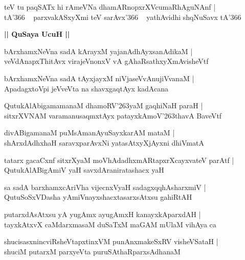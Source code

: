 \documentclass[twoside,12pt,openright]{book}
\def\S{\char'263}
\newcounter{shloka}[chapter]
\def\uvaca#1{\centerline{{\large\textbf{#1}}}}
\begin{document}
\begin{shloka}%
teV tu paqSATx hi rAmeVNa dhamARnopxrXVcumaRhAguNAnf |\\
tA\char'366 ~ parxvakASxyXmi  teV sarAvx\char'366 ~ yathAvidhi shqNuSavx tA\char'366
\end{shloka}

\uvaca{|| QuSaya UcuH ||}

\begin{shloka}%
bArxhamxNeVna sadA kArayxM yajanAdhAyxsanAdikaM |\\
veVdAnapxThitAvx virajeVnonxV vA gAhaRsathxyXmAvisheVtf
\end{shloka}

\begin{shloka}%
bArxhamxNeVna sadA tAyxjayxM niVjaseVvAnujiVvanaM |\\
ApadagxtoVpi jeVveVta na shavxgaqtAyx kadAcana 
\end{shloka}

\begin{shloka}%
QutukAlAbigamamanaM dhamoRV\S yaM gaqhiNaH paraH |\\
sitxrXVNAM varamanusaqmxtAyx patayxkAmoV\S thavA BaveVtf
\end{shloka}

\begin{shloka}%
divABigamanaM puMsAmanAyuSayxkarAM mataM |\\
shArxdAdhxhaH saravxparAvxNi yatasAtxyXjAyxni dhiVmatA 
\end{shloka}

\begin{shloka}%
tatarx gacaCxnf sitxrXyaM moVhAdadhxmARtapxrXcayxvateV parAtf |\\
QutukAlABigAmiV yaH savxdAraniratashacx yaH 
\end{shloka}

\begin{shloka}%
sa sadA barxhamxcAriVha vijecnxVyaH sadagxqqhAsharxmiV |\\
QutuSoSxVDasha yAmiVnayxshacxtasarxsAtxsu gahiRtAH
\end{shloka}

\begin{shloka}%
putarxdAsAtxsu yA yugAmx ayugAmxH kanayxkAparxdAH |\\
tayxkAtxvX caMdarxmasaM duSaTxM maGAM mUlaM vihAya ca 
\end{shloka}

\begin{shloka}%
shucisasxnincviRsheVtapxtinxVM punAnxmakeSxRV visheVSataH |\\
shuciM putarxM parxyeVta puruSAthaRparxsAdhanaM 
\end{shloka}
\end{document}
